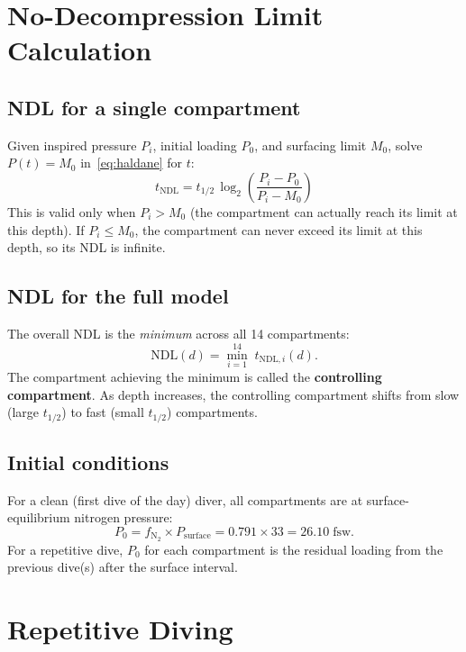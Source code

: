 \documentclass[11pt,letterpaper]{article}
\begin{document}
\section{No-Decompression Limit Calculation}

\subsection{NDL for a single compartment}

Given inspired pressure $P_i$, initial loading $P_0$, and surfacing limit
$M_{0}$, solve $P(t) = M_0$ in~\eqref{eq:haldane} for $t$:
\begin{equation}
  \boxed{
  t_{\mathrm{NDL}} = t_{1/2}\, \log_2\!\left(\frac{P_i - P_0}{P_i - M_0}\right)
  }
  \label{eq:ndl}
\end{equation}
This is valid only when $P_i > M_0$ (the compartment can actually reach
its limit at this depth).  If $P_i \le M_0$, the compartment can never
exceed its limit at this depth, so its NDL is infinite.

\subsection{NDL for the full model}

The overall NDL is the \emph{minimum} across all 14 compartments:
\[
  \mathrm{NDL}(d) = \min_{i=1}^{14}\; t_{\mathrm{NDL},i}(d).
\]
The compartment achieving the minimum is called the
\textbf{controlling compartment}.  As depth increases, the controlling
compartment shifts from slow (large $t_{1/2}$) to fast (small $t_{1/2}$)
compartments.

\subsection{Initial conditions}

For a clean (first dive of the day) diver, all compartments are at
surface-equilibrium nitrogen pressure:
\[
  P_0 = f_{\mathrm{N}_2} \times P_{\text{surface}} = 0.791 \times 33 = 26.10\;\text{fsw}.
\]
For a repetitive dive, $P_0$ for each compartment is the residual loading
from the previous dive(s) after the surface interval.


\section{Repetitive Diving}
\end{document}
